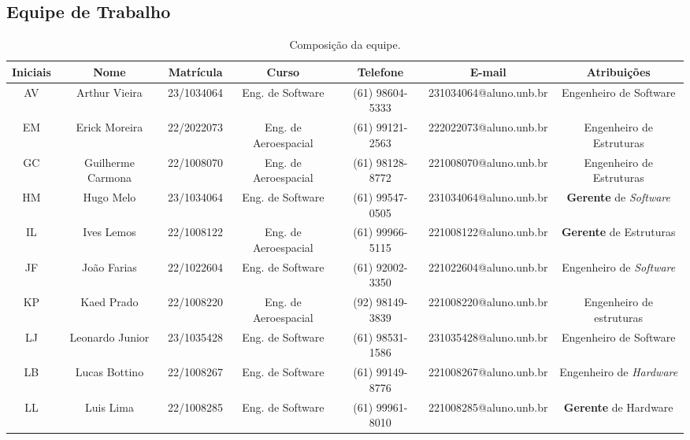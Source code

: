 \begin{landscape}

\chapter{Equipe de Trabalho}

\begin{table}[htpb]
\begin{center}
\caption{Composição da equipe.}
\begin{tabular}{|c|c|c|c|c|c|c|}
\hline
\textbf{Iniciais} & \textbf{Nome} & \textbf{Matrícula} & \textbf{Curso} & \textbf{Telefone} & \textbf{E-mail} & \textbf{Atribuições}\\ \hline
AV & Arthur Vieira        & 23/1034064        & Eng. de Software      & (61) 98604-5333   & 231034064@aluno.unb.br   & Engenheiro de Software \\ \hline
EM & Erick Moreira         & 22/2022073        & Eng. de Aeroespacial  & (61) 99121-2563   & 222022073@aluno.unb.br   & Engenheiro de Estruturas \\ \hline
GC & Guilherme Carmona     & 22/1008070        & Eng. de Aeroespacial  & (61) 98128-8772   & 221008070@aluno.unb.br   & Engenheiro de Estruturas \\ \hline
HM & Hugo Melo             & 23/1034064        & Eng. de Software      & (61) 99547-0505   & 231034064@aluno.unb.br   & \textbf{Gerente} de \textit{Software} \\ \hline
IL & Ives Lemos            & 22/1008122        & Eng. de Aeroespacial  & (61) 99966-5115   & 221008122@aluno.unb.br   & \textbf{Gerente} de Estruturas \\ \hline
JF & João Farias           & 22/1022604        & Eng. de Software      & (61) 92002-3350   & 221022604@aluno.unb.br   & Engenheiro de \textit{Software} \\ \hline
KP & Kaed Prado            & 22/1008220        & Eng. de Aeroespacial  & (92) 98149-3839   & 221008220@aluno.unb.br   & Engenheiro de estruturas \\ \hline
LJ & Leonardo Junior       & 23/1035428        & Eng. de Software      & (61) 98531-1586   & 231035428@aluno.unb.br   & Engenheiro de Software \\ \hline
LB & Lucas Bottino         & 22/1008267        & Eng. de Software      & (61) 99149-8776   & 221008267@aluno.unb.br   & Engenheiro de \textit{Hardware} \\ \hline
LL & Luis Lima             & 22/1008285        & Eng. de Software      & (61) 99961-8010   & 221008285@aluno.unb.br   & \textbf{Gerente} de Hardware \\ \hline

\end{tabular}
\end{center}
\end{table}
\end{landscape}
